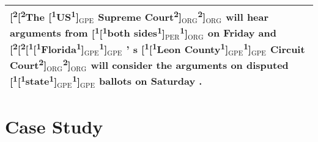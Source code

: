 \documentclass[11pt,a4paper]{article}
\begin{document}
\begin{table*}
\begin{tabular}{m{15.5cm}}
    \midrule
    {\color{red}[\textsuperscript{2}}{\color{blue}[\textsuperscript{2}}The {\color{blue}[\textsuperscript{1}}US{\color{blue}\textsuperscript{1}]$_{\text{GPE}}$} Supreme Court{\color{blue}\textsuperscript{2}]$_{\text{ORG}}$}{\color{red}\textsuperscript{2}]$_{\text{ORG}}$} will hear arguments from {\color{red}[\textsuperscript{1}}{\color{blue}[\textsuperscript{1}}both sides{\color{blue}\textsuperscript{1}]$_{\text{PER}}$}{\color{red}\textsuperscript{1}]$_{\text{ORG}}$} on Friday and {\color{red}[\textsuperscript{2}}{\color{blue}[\textsuperscript{2}}{\color{red}[\textsuperscript{1}}{\color{blue}[\textsuperscript{1}}Florida{\color{blue}\textsuperscript{1}]$_{\text{GPE}}$}{\color{red}\textsuperscript{1}]$_{\text{GPE}}$} ' s    {\color{red}[\textsuperscript{1}}{\color{blue}[\textsuperscript{1}}Leon County{\color{blue}\textsuperscript{1}]$_{\text{GPE}}$}{\color{red}\textsuperscript{1}]$_{\text{GPE}}$} Circuit Court{\color{blue}\textsuperscript{2}]$_{\text{ORG}}$}{\color{red}\textsuperscript{2}]$_{\text{ORG}}$} will consider the arguments on disputed    {\color{red}[\textsuperscript{1}}{\color{blue}[\textsuperscript{1}}state{\color{blue}\textsuperscript{1}]$_{\text{GPE}}$}{\color{red}\textsuperscript{1}]$_{\text{GPE}}$} ballots on Saturday .\\
  \bottomrule
 \end{tabular}
 \caption{Cases Study. Blue brackets indicate entities predicted by the model, red brackets indicate true entities, the labels in the lower right corner indicate the type of entity, and the superscripts indicate the level of the nesting.}
  \label{tab:error}
\end{table*}










\section{Case Study}
\end{document}
